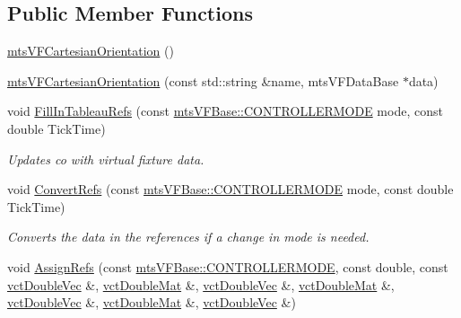 \subsection*{Public Member Functions}
\begin{DoxyCompactItemize}
\item 
\hyperlink{classmts_v_f_cartesian_orientation_a1682f34e52c864a10d761f187fbeb4a4}{mts\-V\-F\-Cartesian\-Orientation} ()
\item 
\hyperlink{classmts_v_f_cartesian_orientation_afdf64942e810ea8a2dea4721673fa8e5}{mts\-V\-F\-Cartesian\-Orientation} (const std\-::string \&name, mts\-V\-F\-Data\-Base $\ast$data)
\item 
void \hyperlink{classmts_v_f_cartesian_orientation_a80dfa0f85f6f140b27bda5542580e5b9}{Fill\-In\-Tableau\-Refs} (const \hyperlink{classmts_v_f_base_a742dd08f8b70bafeb746cec14d9ee974}{mts\-V\-F\-Base\-::\-C\-O\-N\-T\-R\-O\-L\-L\-E\-R\-M\-O\-D\-E} mode, const double Tick\-Time)
\begin{DoxyCompactList}\small\item\em Updates co with virtual fixture data. \end{DoxyCompactList}\item 
void \hyperlink{classmts_v_f_cartesian_orientation_a4cde57769f67efae868f3478f254d7d8}{Convert\-Refs} (const \hyperlink{classmts_v_f_base_a742dd08f8b70bafeb746cec14d9ee974}{mts\-V\-F\-Base\-::\-C\-O\-N\-T\-R\-O\-L\-L\-E\-R\-M\-O\-D\-E} mode, const double Tick\-Time)
\begin{DoxyCompactList}\small\item\em Converts the data in the references if a change in mode is needed. \end{DoxyCompactList}\item 
void \hyperlink{classmts_v_f_cartesian_orientation_a96a3833d5bc6b1e9845c71046b9ee088}{Assign\-Refs} (const \hyperlink{classmts_v_f_base_a742dd08f8b70bafeb746cec14d9ee974}{mts\-V\-F\-Base\-::\-C\-O\-N\-T\-R\-O\-L\-L\-E\-R\-M\-O\-D\-E}, const double, const \hyperlink{vct_dynamic_vector_types_8h_ade4b3068c86fb88f41af2e5187e491c2}{vct\-Double\-Vec} \&, \hyperlink{vct_dynamic_matrix_types_8h_a48f1eb2461d20a99e824ee5753a37c84}{vct\-Double\-Mat} \&, \hyperlink{vct_dynamic_vector_types_8h_ade4b3068c86fb88f41af2e5187e491c2}{vct\-Double\-Vec} \&, \hyperlink{vct_dynamic_matrix_types_8h_a48f1eb2461d20a99e824ee5753a37c84}{vct\-Double\-Mat} \&, \hyperlink{vct_dynamic_vector_types_8h_ade4b3068c86fb88f41af2e5187e491c2}{vct\-Double\-Vec} \&, \hyperlink{vct_dynamic_matrix_types_8h_a48f1eb2461d20a99e824ee5753a37c84}{vct\-Double\-Mat} \&, \hyperlink{vct_dynamic_vector_types_8h_ade4b3068c86fb88f41af2e5187e491c2}{vct\-Double\-Vec} \&)
\end{DoxyCompactItemize}
